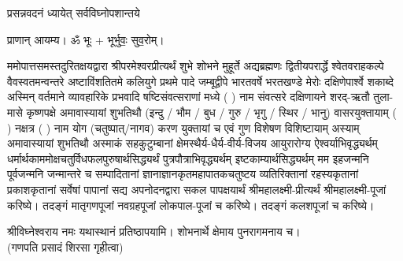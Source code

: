 
\setlength{\parindent}{0pt}


 

{प्रसन्नवदनं ध्यायेत् सर्वविघ्नोपशान्तये}
 
प्राणान्  आयम्य।  ॐ भूः + भूर्भुवः॒ सुव॒रोम्।


ममोपात्तसमस्तदुरितक्षयद्वारा श्रीपरमेश्वरप्रीत्यर्थं शुभे शोभने मुहूर्ते अद्यब्रह्मणः
द्वितीयपरार्द्धे श्वेतवराहकल्पे वैवस्वतमन्वन्तरे अष्टाविंशतितमे कलियुगे प्रथमे पादे
जम्बूद्वीपे भारतवर्षे भरतखण्डे मेरोः दक्षिणेपार्श्वे शकाब्दे अस्मिन् वर्तमाने व्यावहारिके
 प्रभवादि षष्टिसंवत्सराणां मध्ये (  ) नाम संवत्सरे दक्षिणायने 
शरद्-ऋतौ तुला-मासे कृष्णपक्षे अमावास्यायां शुभतिथौ
(इन्दु / भौम / बुध / गुरु / भृगु / स्थिर / भानु) वासरयुक्तायाम्
(  ) नक्षत्र (  ) नाम  योग  (चतुष्पात्/नागव) करण युक्तायां च एवं गुण विशेषण विशिष्टायाम्
अस्याम् अमावास्यायां शुभतिथौ 
अस्माकं सहकुटुम्बानां क्षेमस्थैर्य-धैर्य-वीर्य-विजय आयुरारोग्य ऐश्वर्याभिवृद्ध्यर्थम्
 धर्मार्थकाममोक्ष\-चतुर्विधफलपुरुषार्थसिद्ध्यर्थं पुत्रपौत्राभि\-वृद्ध्यर्थम् इष्टकाम्यार्थसिद्ध्यर्थम्
मम इहजन्मनि पूर्वजन्मनि जन्मान्तरे च सम्पादितानां ज्ञानाज्ञानकृतमहा\-पातकचतुष्टय
व्यतिरिक्तानां रहस्यकृतानां प्रकाशकृतानां सर्वेषां पापानां सद्य अपनोदनद्वारा सकल 
पापक्षयार्थं
श्रीमहालक्ष्मी-प्रीत्यर्थं श्रीमहालक्ष्मी-पूजां करिष्ये। तदङ्गं मातृगणपूजां नवग्रहपूजां लोकपाल-पूजां च करिष्ये। 
तदङ्गं कलशपूजां च करिष्ये। 


श्रीविघ्नेश्वराय नमः यथास्थानं प्रतिष्ठापयामि। शोभनार्थे क्षेमाय पुनरागमनाय च।\\
(गणपति प्रसादं शिरसा गृहीत्वा)



















